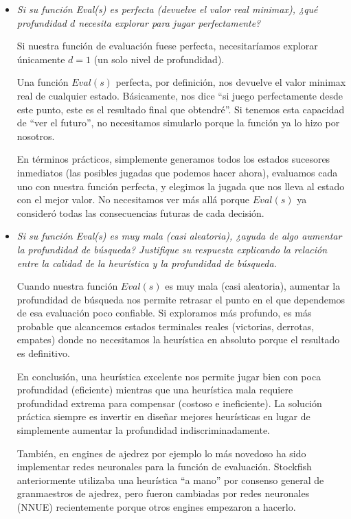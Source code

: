 \documentclass[11pt]{article}
\begin{document}
\begin{itemize}[leftmargin=*, itemsep=0.8em]

	\item \textit{Si su función Eval(s) es perfecta (devuelve el valor real minimax), ¿qué profundidad $d$ necesita
		      explorar para jugar perfectamente?}

	      Si nuestra función de evaluación fuese perfecta, necesitaríamos explorar únicamente $d = 1$ (un solo
	      nivel de profundidad).

	      Una función $Eval(s)$ perfecta, por definición, nos devuelve el valor minimax real de cualquier estado.
	      Básicamente, nos dice ``si juego perfectamente desde este punto, este es el resultado final que obtendré''. Si
	      tenemos esta capacidad de ``ver el futuro'', no necesitamos simularlo porque la función ya lo hizo por nosotros.

	      En términos prácticos, simplemente generamos todos los estados sucesores inmediatos (las posibles jugadas que
	      podemos hacer ahora), evaluamos cada uno con nuestra función perfecta, y elegimos la jugada que nos lleva al
	      estado con el mejor valor. No necesitamos ver más allá porque $Eval(s)$ ya consideró todas las consecuencias
	      futuras de cada decisión.

	\item \textit{Si su función Eval(s) es muy mala (casi aleatoria), ¿ayuda de algo aumentar la profundidad de
		      búsqueda? Justifique su respuesta explicando la relación entre la calidad de la heurística y la
		      profundidad de búsqueda.}

	      Cuando nuestra función $Eval(s)$ es muy mala (casi aleatoria), aumentar la profundidad de búsqueda nos permite
	      retrasar el punto en el que dependemos de esa evaluación poco confiable. Si exploramos más profundo,
	      es más probable que alcancemos estados terminales reales (victorias, derrotas, empates) donde no necesitamos
	      la heurística en absoluto porque el resultado es definitivo.

	      En conclusión, una heurística excelente nos permite jugar bien con poca profundidad (eficiente) mientras que
	      una heurística mala requiere profundidad extrema para compensar (costoso e ineficiente). La solución práctica siempre es
	      invertir en diseñar mejores heurísticas en lugar de simplemente aumentar la profundidad indiscriminadamente.

	      También, en engines de ajedrez por ejemplo lo más novedoso ha sido implementar redes neuronales para la función de evaluación. Stockfish
	      anteriormente utilizaba una heurística ``a mano'' por consenso general de granmaestros de ajedrez, pero fueron cambiadas por redes neuronales
	      (NNUE) recientemente porque otros engines empezaron a hacerlo.

\end{itemize}
\end{document}
